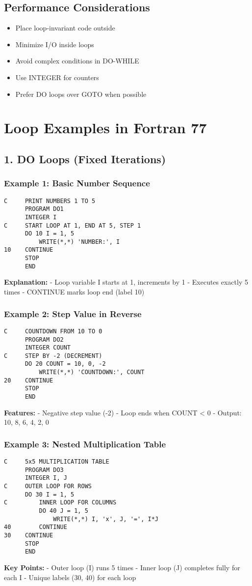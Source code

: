 \documentclass{book}
\begin{document}
\subsection*{Performance Considerations}
\begin{itemize}
\item Place loop-invariant code outside
\item Minimize I/O inside loops
\item Avoid complex conditions in DO-WHILE
\item Use INTEGER for counters
\item Prefer DO loops over GOTO when possible
\end{itemize}

\section{Loop Examples in Fortran 77}

\subsection*{1. DO Loops (Fixed Iterations)}
\subsubsection*{Example 1: Basic Number Sequence}
\begin{verbatim}
C     PRINT NUMBERS 1 TO 5
      PROGRAM DO1
      INTEGER I
C     START LOOP AT 1, END AT 5, STEP 1
      DO 10 I = 1, 5
          WRITE(*,*) 'NUMBER:', I
10    CONTINUE
      STOP
      END
\end{verbatim}
\textbf{Explanation:}
- Loop variable I starts at 1, increments by 1
- Executes exactly 5 times
- CONTINUE marks loop end (label 10)

\subsubsection*{Example 2: Step Value in Reverse}
\begin{verbatim}
C     COUNTDOWN FROM 10 TO 0
      PROGRAM DO2
      INTEGER COUNT
C     STEP BY -2 (DECREMENT)
      DO 20 COUNT = 10, 0, -2
          WRITE(*,*) 'COUNTDOWN:', COUNT
20    CONTINUE
      STOP
      END
\end{verbatim}
\textbf{Features:}
- Negative step value (-2)
- Loop ends when COUNT < 0
- Output: 10, 8, 6, 4, 2, 0

\subsubsection*{Example 3: Nested Multiplication Table}
\begin{verbatim}
C     5x5 MULTIPLICATION TABLE
      PROGRAM DO3
      INTEGER I, J
C     OUTER LOOP FOR ROWS
      DO 30 I = 1, 5
C         INNER LOOP FOR COLUMNS
          DO 40 J = 1, 5
              WRITE(*,*) I, 'x', J, '=', I*J
40        CONTINUE
30    CONTINUE
      STOP
      END
\end{verbatim}
\textbf{Key Points:}
- Outer loop (I) runs 5 times
- Inner loop (J) completes fully for each I
- Unique labels (30, 40) for each loop
\end{document}
